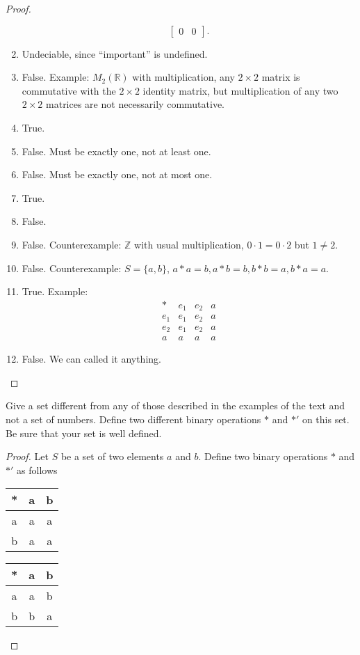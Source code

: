 \begin{proof}
\begin{enumerate}[label={\textbf{\alph*.}},itemsep=0pt,topsep=0pt]
\[\begin{bmatrix}
                      0 & 0
                  \end{bmatrix}.
              \]
        \item Undeciable, since ``important'' is undefined.
        \item False. Example: $M_{2}(\mathbb{R})$ with multiplication, any $2\times 2$ matrix is commutative with the $2\times 2$ identity matrix, but multiplication of any two $2\times 2$ matrices are not necessarily commutative.
        \item True.
        \item False. Must be exactly one, not at least one.
        \item False. Must be exactly one, not at most one.
        \item True.
        \item False.
        \item False. Counterexample: $\mathbb{Z}$ with usual multiplication, $0 \cdot 1 = 0 \cdot 2$ but $1 \ne 2$.
        \item False. Counterexample: $S = \{ a, b \}$, $a * a = b, a * b = b, b * b = a, b * a = a$.
        \item True. Example:
              \[
                  \begin{array}{c|ccc}
                      *     & e_{1} & e_{2} & a \\
                      \hline
                      e_{1} & e_{1} & e_{2} & a \\
                      e_{2} & e_{1} & e_{2} & a \\
                      a     & a     & a     & a
                  \end{array}
              \]
        \item False. We can called it anything.
    \end{enumerate}
\end{proof}

\newpage
\begin{exercise}
    Give a set different from any of those described in the examples of the text and not a set of numbers. Define two different binary operations $*$ and $*'$ on this set. Be sure that your set is well defined.
\end{exercise}

\begin{proof}
    Let $S$ be a set of two elements $a$ and $b$. Define two binary operations $*$ and $*'$ as follows
    \begin{tabular}{c|cc}
        * & a & b \\
        \hline
        a & a & a \\
        b & a & a
    \end{tabular}
    \begin{tabular}{c|cc}
        * & a & b \\
        \hline
        a & a & b \\
        b & b & a
    \end{tabular}
\end{proof}

